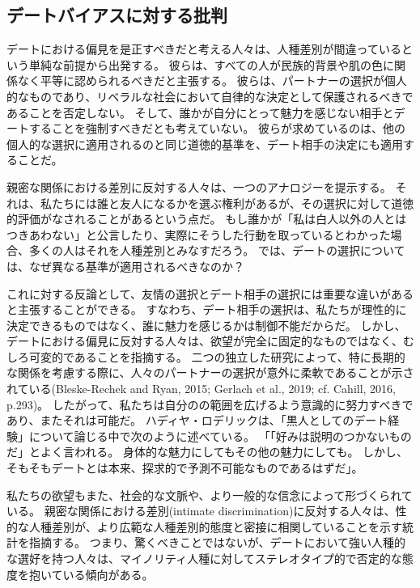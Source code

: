 \documentclass[paper=a4,book,openany]{jlreq} \usepackage{mystyle}
\begin{document}
\subsection{デートバイアスに対する批判}

デートにおける偏見を是正すべきだと考える人々は、人種差別が間違っているという単純な前提から出発する。
彼らは、すべての人が民族的背景や肌の色に関係なく平等に認められるべきだと主張する。
彼らは、パートナーの選択が個人的なものであり、リベラルな社会において自律的な決定として保護されるべきであることを否定しない。
そして、誰かが自分にとって魅力を感じない相手とデートすることを強制すべきだとも考えていない。
彼らが求めているのは、他の個人的な選択に適用されるのと同じ道徳的基準を、デート相手の決定にも適用することだ。

親密な関係における差別に反対する人々は、一つのアナロジーを提示する。
それは、私たちには誰と友人になるかを選ぶ権利があるが、その選択に対して道徳的評価がなされることがあるという点だ。
もし誰かが「私は白人以外の人とはつきあわない」と公言したり、実際にそうした行動を取っているとわかった場合、多くの人はそれを人種差別とみなすだろう。
では、デートの選択については、なぜ異なる基準が適用されるべきなのか？

これに対する反論として、友情の選択とデート相手の選択には重要な違いがあると主張することができる。
すなわち、デート相手の選択は、私たちが理性的に決定できるものではなく、誰に魅力を感じるかは制御不能だからだ。
しかし、デートにおける偏見に反対する人々は、欲望が完全に固定的なものではなく、むしろ可変的であることを指摘する。
二つの独立した研究によって、特に長期的な関係を考慮する際に、人々のパートナーの選択が意外に柔軟であることが示されている(Bleske-Rechek and Ryan, 2015; Gerlach et al., 2019; cf. Cahill, 2016, p.293)。
\nocite{bleske-rechek15:_contin_chang_emerg,gerlach19:_predic_valid_adjus}
\nocite{cahill16:_sexual_desir_inequal_possib_trans}
したがって、私たちは自分のの範囲を広げるよう意識的に努力すべきであり、またそれは可能だ。
ハディヤ・ロデリックは、「黒人としてのデート経験」について論じる中で次のように述べている。
「「好みは説明のつかないものだ」とよく言われる。
身体的な魅力にしてもその他の魅力にしても。
しかし、そもそもデートとは本来、探求的で予測不可能なものであるはずだ」\citep{roderique17:_datin_black}。

私たちの欲望もまた、社会的な文脈や、より一般的な信念によって形づくられている。
親密な関係における差別(intimate discrimination)に反対する人々は、性的な人種差別が、より広範な人種差別的態度と密接に相関していることを示す統計を指摘する。
つまり、驚くべきことではないが、デートにおいて強い人種的な選好を持つ人々は、マイノリティ人種に対してステレオタイプ的で否定的な態度を抱いている傾向がある\citep{callander15:_is_sexual_racis_reall_racis}。
\end{document}
